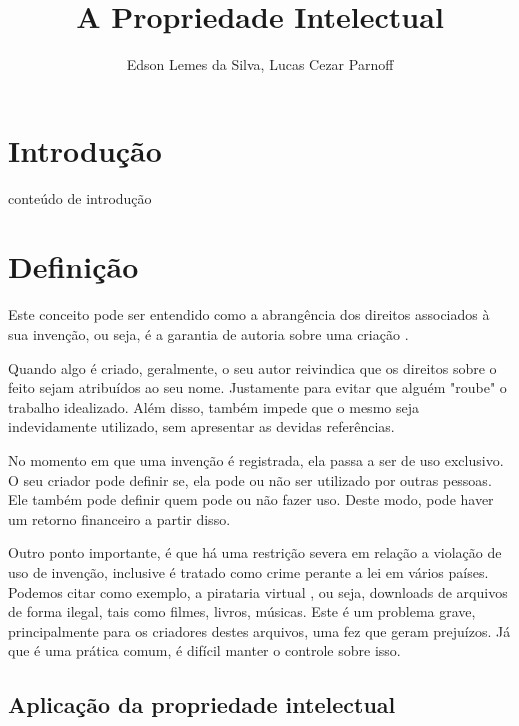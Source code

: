 \documentclass[12pt]{article}
\title{A Propriedade Intelectual}
\author{Edson Lemes da Silva\inst{1}, Lucas Cezar Parnoff\inst{1}  }
\begin{document}
 

\maketitle

\begin{abstract}
  
\end{abstract}
     
\begin{resumo} 
  
\end{resumo}

\section{Introdução}\label{sec:introducao}

conteúdo de introdução

\section{Definição}\label{sec:conteudo}

Este conceito pode ser entendido como a abrangência  dos direitos associados à sua invenção, ou seja, é a garantia de autoria sobre uma criação \cite{UFAL}.

Quando algo é criado, geralmente, o seu autor reivindica que os direitos sobre o feito sejam atribuídos ao seu nome. Justamente para evitar que alguém "roube" o trabalho idealizado. Além disso, também impede que o mesmo seja indevidamente utilizado, sem apresentar as devidas referências.

No momento em que uma invenção é registrada, ela passa a ser de uso exclusivo. O seu criador pode definir se, ela pode ou não ser utilizado por outras pessoas. Ele também pode definir quem pode ou não fazer uso. Deste modo, pode haver um retorno financeiro a partir disso.

Outro ponto importante, é que há uma restrição severa em relação a violação de uso de invenção, inclusive é tratado como crime perante a lei em vários países. Podemos citar como exemplo, a pirataria virtual \cite{PIRATE}, ou seja, downloads de arquivos de forma ilegal, tais como filmes, livros, músicas. Este é um problema grave, principalmente para os criadores destes arquivos, uma fez que geram prejuízos. Já que é uma prática comum, é difícil manter o controle sobre isso.  
 


\subsection{Aplicação da propriedade intelectual} \label{sec:sub1}









 



\end{document}
